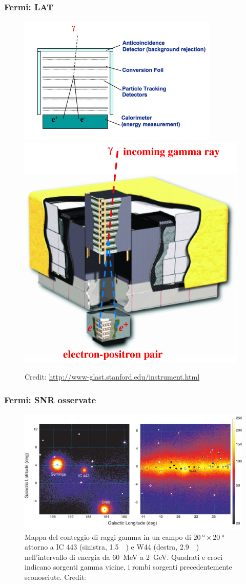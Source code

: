 \documentclass[10pt]{beamer}
\begin{document}
\begin{frame}
  \frametitle{Fermi: LAT}
  \begin{figure}
    \centering
    \includegraphics[width=0.6\columnwidth]{Gamma_telescope_schematic}
    \includegraphics[width=0.4\columnwidth]{f1}
    \caption{Credit: \url{http://www-glast.stanford.edu/instrument.html}}
  \end{figure}
\end{frame}

\begin{frame}
  \frametitle{Fermi: SNR osservate}
  \begin{figure}
    \centering
    \includegraphics[width=0.8\columnwidth]{1231160fig1.pdf}
    \caption{Mappa del conteggio di raggi gamma in un campo di
      $\SI{20}{\degree} \times \SI{20}{\degree}$ attorno a IC 443 (sinistra,
      \SI{1.5}{\kilo \parsec}) e W44 (destra, \SI{2.9}{\kilo \parsec})
      nell'intervallo di energia da \SI{60}{\mega\electronvolt} a
      \SI{2}{\giga\electronvolt}.  Quadrati e croci indicano sorgenti gamma
      vicine, i rombi sorgenti precedentemente sconosciute.  Credit:
      \textcite{2013Sci...339..807A}}
  \end{figure}
\end{frame}
\end{document}
